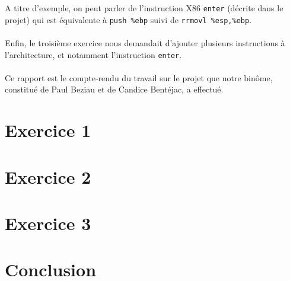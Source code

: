 \documentclass[12pt]{article}
\begin{document}
A titre d'exemple, on peut parler de l'instruction X86 \verb+enter+ (décrite dans le projet) qui est équivalente à \verb+push %ebp+ suivi de \verb+rrmovl %esp,%ebp+.

\paragraph{}Enfin, le troisième exercice nous demandait d'ajouter plusieurs instructions à l'architecture, et notamment l'instruction \verb+enter+.

\paragraph{}Ce rapport est le compte-rendu du travail sur le projet que notre binôme, constitué de Paul Beziau et de Candice Bentéjac, a effectué.



\section{Exercice 1}



\section{Exercice 2}



\section{Exercice 3}

\section*{Conclusion}
\end{document}
